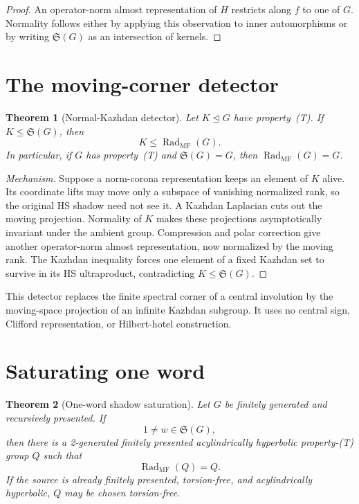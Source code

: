 \documentclass[10pt]{amsart}
\newtheorem{theorem}{Theorem}[section]
\theoremstyle{definition}
\theoremstyle{remark}
\newcommand{\Shadow}{\mathfrak S}
\newcommand{\MFRad}{\operatorname{Rad}_{\mathrm{MF}}}
\begin{document}
\begin{proof}
An operator-norm almost representation of $H$ restricts along $f$ to one of
$G$.  Normality follows either by applying this observation to inner
automorphisms or by writing $\Shadow(G)$ as an intersection of kernels.
\end{proof}

\section{The moving-corner detector}

\begin{theorem}[Normal-Kazhdan detector]\label{thm:detector}
Let $K\trianglelefteq G$ have property~\textup{(T)}.  If
$K\leq\Shadow(G)$, then
\[
 K\leq\MFRad(G).
\]
In particular, if $G$ has property~\textup{(T)} and $\Shadow(G)=G$, then
$\MFRad(G)=G$.
\end{theorem}

\begin{proof}[Mechanism]
Suppose a norm-corona representation keeps an element of $K$ alive.  Its
coordinate lifts may move only a subspace of vanishing normalized rank, so
the original HS shadow need not see it.  A Kazhdan Laplacian cuts out the
moving projection.  Normality of $K$ makes these projections asymptotically
invariant under the ambient group.  Compression and polar correction give
another operator-norm almost representation, now normalized by the moving
rank.  The Kazhdan inequality forces one element of a fixed Kazhdan set to
survive in its HS ultraproduct, contradicting $K\leq\Shadow(G)$.
\end{proof}

This detector replaces the finite spectral corner of a central involution
by the moving-space projection of an infinite Kazhdan subgroup.  It uses no
central sign, Clifford representation, or Hilbert-hotel construction.

\section{Saturating one word}

\begin{theorem}[One-word shadow saturation]\label{thm:saturation}
Let $G$ be finitely generated and recursively presented.  If
\[
 1\neq w\in\Shadow(G),
\]
then there is a 2-generated finitely presented acylindrically hyperbolic
property-\textup{(T)} group $Q$ such that
\[
 \MFRad(Q)=Q.
\]
If the source is already finitely presented, torsion-free, and
acylindrically hyperbolic, $Q$ may be chosen torsion-free.
\end{theorem}
\end{document}
